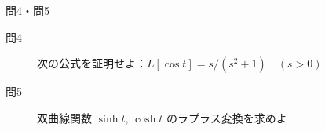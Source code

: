 \begin{frame}{問4・問5}
  \begin{description}
    \item[問4] 次の公式を証明せよ：$L[\cos t] = s/(s^2+1) \quad (s > 0)$
    \item[問5] 双曲線関数 $\sinh t,\, \cosh t$ のラプラス変換を求めよ
  \end{description}
\end{frame}

